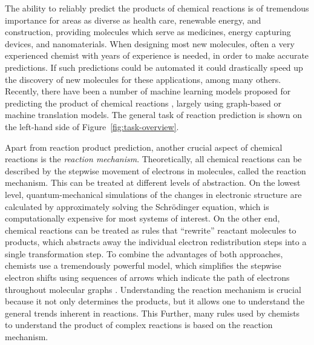 
The ability to reliably predict the products of chemical reactions is of tremendous importance for areas as diverse as health care, renewable energy, and construction, providing molecules which serve as medicines, energy capturing devices, and nanomaterials. 
When designing most new molecules, often a very experienced chemist with years of experience is needed, in order to make accurate predictions. 
If such predictions could be automated it could drastically speed up the discovery of new molecules for these applications, among many others. Recently, there have been a number of machine learning models proposed for predicting the product of chemical reactions \cite{coley2017prediction,jin2017predicting,schwaller2017found,neural-symbolic,segler2018planning,wei2016neural,zhang2005structure}, largely using graph-based or machine translation models. The general task of reaction prediction is shown on the left-hand side of Figure~\ref{fig:task-overview}.

Apart from reaction product prediction, another crucial aspect of chemical reactions is the \emph{reaction mechanism}. Theoretically, all chemical reactions can be described by the stepwise movement of electrons in molecules, called the reaction mechanism.
This can be treated at different levels of abstraction. On the lowest level, quantum-mechanical simulations of the  changes in electronic structure are calculated by approximately solving the Schrödinger equation, which is computationally expensive for most systems of interest. 
On the other end, chemical reactions can be treated as rules that ``rewrite'' reactant molecules to products, which abstracts away the individual electron redistribution steps into a single transformation step. 
To combine the advantages of both approaches, chemists use a tremendously powerful model, which simplifies the stepwise electron shifts using sequences of arrows which indicate the path of electrons throughout molecular graphs \cite{herges1994organizing}. 
Understanding the reaction mechanism is crucial because it not only determines the products, but it allows one to understand the general trends inherent in reactions. This Further, many rules used by chemists to understand the product of complex reactions is based on the reaction mechanism.


